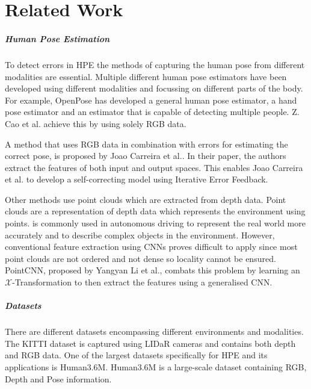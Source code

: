 \chapter{Related Work}
\label{sec:related_work}

\paragraph{Human Pose Estimation}

To detect errors in HPE the methods of capturing the human pose from different modalities are essential. Multiple different human pose estimators have been developed using different modalities and focussing on different parts of the body. For example, OpenPose has developed a general human pose estimator\cite{OpenPosePose},  a hand pose estimator\cite{OpenPoseHand} and an estimator that is capable of detecting multiple people\cite{OpenPoseMulti}. Z. Cao et al. achieve this by using solely RGB data.

A method that uses RGB data in combination with errors for estimating the correct pose, is proposed by Joao Carreira et al.\cite{IterativeErrorFeedback}. In their paper, the authors extract the features of both input and output spaces. This enables Joao Carreira et al. to develop a self-correcting model using Iterative Error Feedback. 

Other methods use point clouds which are extracted from depth data. Point clouds are a representation of depth data which represents the environment using points. is commonly used in autonomous driving to represent the real world more accurately and to describe complex objects in the environment. However, conventional feature extraction using CNNs proves difficult to apply since most point clouds are not ordered and not dense so locality cannot be ensured. PointCNN, proposed by Yangyan Li et al.\cite{li2018pointcnn}, combats this problem by learning an $\mathcal{X}$-Transformation to then extract the features using a generalised CNN.


\paragraph{Datasets}

There are different datasets encompassing different environments and modalities. The KITTI dataset is captured using LIDaR cameras and contains both depth and RGB data\cite{Geiger2012CVPR}. One of the largest datasets specifically for HPE and its applications is Human3.6M\cite{h36m_pami}. Human3.6M is a large-scale dataset containing RGB, Depth and Pose information.


